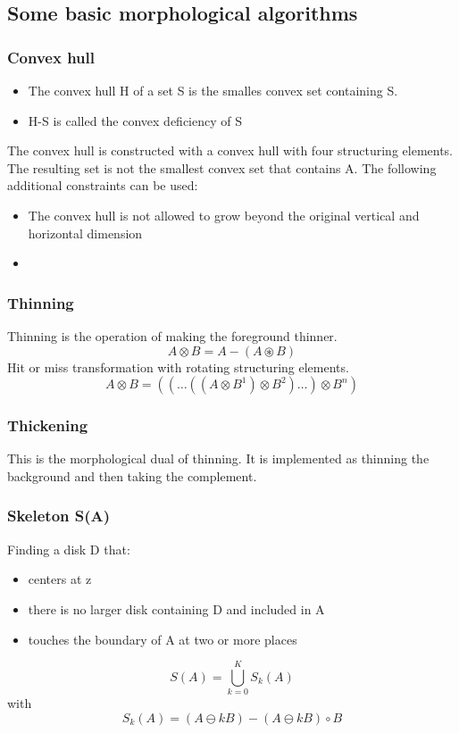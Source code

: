 \subsection{Some basic morphological algorithms}
\subsubsection{Convex hull}
\begin{itemize}
\item The convex hull H of a set S is the smalles convex set containing S.
\item H-S is called the convex deficiency of S
\end{itemize}
The convex hull is constructed with a convex hull with four structuring elements.
The resulting set is not the smallest convex set that contains A. The following additional constraints can be used:
\begin{itemize}
\item The convex hull is not allowed to grow beyond the original vertical and horizontal dimension
\item 
\end{itemize}

\subsubsection{Thinning}
Thinning is the operation of making the foreground thinner.
	\[
		A \otimes  B = A - (A \circledast B)	
	\]	
Hit or miss transformation with rotating structuring elements.\\

	\[
		A \otimes  {B} = ((\ldots((A \otimes B^{1}) \otimes B^{2})\ldots) \otimes B^{n})	
	\]	

\subsubsection{Thickening}
This is the morphological dual of thinning. It is implemented as thinning the background and then taking the complement.

\subsubsection{Skeleton S(A)}
Finding a disk D that:
\begin{itemize}
\item centers at z
\item there is no larger disk containing D and included in A
\item touches the boundary of A at two or more places
\end{itemize}
	\[
		S(A) = \bigcup_{k=0}^{K} S_k(A)
	\]
with
	\[
		S_k(A) = (A \ominus kB) - (A \ominus kB) \circ B
	\]
	
